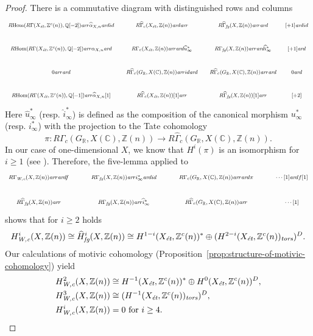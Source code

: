 \documentclass[draft]{article}
\DeclareMathOperator{\Hom}{Hom}
\newcommand{\CC}{\mathbb{C}}
\newcommand{\QQ}{\mathbb{Q}}
\newcommand{\RR}{\mathbb{R}}
\newcommand{\ZZ}{\mathbb{Z}}
\newcommand{\ar}{\text{\it ar}}
\newcommand{\et}{\text{\it \'{e}t}}
\newcommand{\fg}{\text{\it fg}}
\newcommand{\tors}{\text{\it tors}}
\newcommand{\Wc}{\text{\it W,c}}
\newcommand{\RHom}{R\!\Hom}
\theoremstyle{myplain}
\theoremstyle{mydefinition}
\begin{document}
\begin{proof}
  There is a commutative diagram with distinguished rows and columns
  \[ \begin{tikzcd}[font=\footnotesize,column sep=1em]
      \RHom (R\Gamma (X_\et, \ZZ^c(n)), \QQ[-2]) \ar{r}{\widehat{\alpha}_{X,n}} \ar{d}{id} &[0pt] R\widehat{\Gamma}_c (X_\et, \ZZ(n)) \ar{d} \ar{r} & R\widehat{\Gamma}_\fg (X, \ZZ(n)) \ar{r}\ar{d} &[-0.5em] {[+1]} \ar{d}{id} \\
      \RHom (R\Gamma (X_\et, \ZZ^c(n)), \QQ[-2]) \ar{r}{\alpha_{X,n}} \ar{d} & R\Gamma_c (X_\et, \ZZ(n)) \ar{r} \ar{d}{\widehat{u}^*_\infty} & R\Gamma_\fg (X, \ZZ(n)) \ar{r} \ar{d}{\widehat{i}^*_\infty} & {[+1]} \ar{d} \\
      0 \ar{r}\ar{d} & R\widehat{\Gamma}_c (G_\RR, X(\CC), \ZZ(n)) \ar{r}{id} \ar{d} & R\widehat{\Gamma}_c (G_\RR, X(\CC), \ZZ(n)) \ar{r} \ar{d} & 0 \ar{d} \\
      \RHom (R\Gamma (X_\et, \ZZ^c(n)), \QQ[-1]) \ar{r}{\widehat{\alpha}_{X,n} [1]} & R\widehat{\Gamma}_c (X_\et, \ZZ(n)) [1] \ar{r} & R\widehat{\Gamma}_\fg (X, \ZZ(n)) [1] \ar{r} & {[+2]}
    \end{tikzcd} \]
  Here $\widehat{u}^*_\infty$ (resp. $\widehat{i}^*_\infty$)
  is defined as the composition of the canonical morphism $u^*_\infty$
  (resp. $i^*_\infty$) with the projection to the Tate cohomology
  \[
    \pi\colon R\Gamma_c (G_\RR, X(\CC), \ZZ(n)) \to
    R\widehat{\Gamma}_c (G_\RR, X(\CC), \ZZ(n)).
  \]
  In our case of one-dimensional $X$, we know that $H^i (\pi)$ is an isomorphism
  for $i \ge 1$ (see \cite[Proposition~3.2]{Beshenov-Weil-etale-1}). Therefore,
  the five-lemma applied to
  \[ \begin{tikzcd}[font=\footnotesize]
      R\Gamma_\Wc (X, \ZZ(n)) \ar{r}\ar{d}{f} & R\Gamma_\fg (X, \ZZ(n)) \ar{r}{i^*_\infty}\ar{d}{id} & R\Gamma_c (G_\RR, X(\CC), \ZZ(n)) \ar{r}\ar{d}{\pi} & \cdots [1]\ar{d}{f [1]} \\
      R\widehat{\Gamma}_\fg (X, \ZZ(n)) \ar{r} & R\Gamma_\fg (X, \ZZ(n)) \ar{r}{\widehat{i}^*_\infty} & R\widehat{\Gamma}_c (G_\RR, X(\CC), \ZZ(n)) \ar{r} & \cdots [1]
    \end{tikzcd} \]
  shows that for $i \ge 2$ holds
  \[ H^i_\Wc (X, \ZZ(n)) \cong \widehat{H}^i_\fg (X, \ZZ(n))
    \cong H^{1-i} (X_\et, \ZZ^c(n))^*
    \oplus
    (H^{2-i} (X_\et, \ZZ^c (n))_\tors)^D. \]
  Our calculations of motivic cohomology
  (Proposition~\ref{prop:structure-of-motivic-cohomology}) yield
  \begin{align*}
    H^2_\Wc (X, \ZZ(n)) & \cong H^{-1} (X_\et, \ZZ^c(n))^*
                          \oplus
                          H^0 (X_\et, \ZZ^c (n))^D, \\
    H^3_\Wc (X, \ZZ(n)) & \cong (H^{-1} (X_\et, \ZZ^c (n))_\tors)^D, \\
    H^i_\Wc (X, \ZZ(n)) & = 0 \text{ for }i \ge 4. \qedhere
  \end{align*}
\end{proof}
\end{document}

